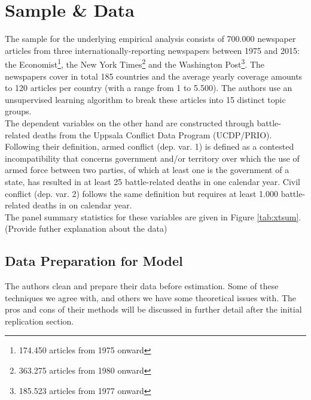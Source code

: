 \section{Sample \& Data}

The sample for the underlying empirical analysis consists of 700.000 newspaper articles from three internationally-reporting newspapers between 1975 and 2015: the Economist\footnote{174.450 articles from 1975 onward}, the New York Times\footnote{363.275 articles from 1980 onward} and the Washington Post\footnote{185.523 articles from 1977 onward}. The newspapers cover in total 185 countries and the average yearly coverage amounts to 120 articles per country (with a range from 1 to 5.500). The authors use an unsupervised learning algorithm to break these articles into 15 distinct topic groups. \\

The dependent variables on the other hand are constructed through battle-related deaths from the Uppsala Conflict Data Program (UCDP/PRIO). Following their definition, armed conflict (dep. var. 1) is defined as a contested incompatibility that concerns government and/or territory over which the use of armed force between two parties, of which at least one is the government of a state, has resulted in at least 25 battle-related deaths in one calendar year. Civil conflict (dep. var. 2) follows the same definition but requires at least 1.000 battle-related deaths in on calendar year. \\

The panel summary statistics for these variables are given in Figure \ref{tab:xtsum}. (Provide futher explanation about the data)

\subsection{Data Preparation for Model} \label{data_prep}
The authors clean and prepare their data before estimation. Some of these techniques we agree with, and others we have some theoretical issues with. The pros and cons of their methods will be discussed in further detail after the initial replication section.

